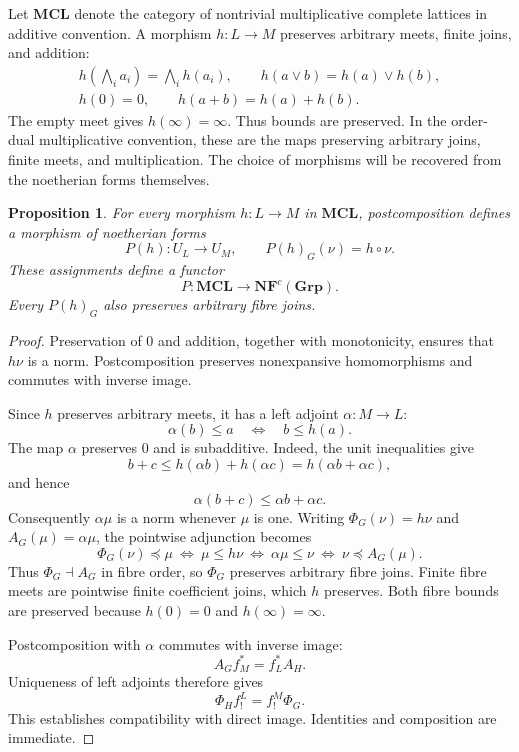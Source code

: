 \documentclass[12pt,a4paper]{amsart}
\newtheorem{proposition}[theorem]{Proposition}
\theoremstyle{definition}
\newcommand{\Grp}{\mathbf{Grp}}
\newcommand{\NF}{\mathbf{NF}}
\newcommand{\MCL}{\mathbf{MCL}}
\begin{document}
Let $\MCL$ denote the category of nontrivial multiplicative complete lattices in additive convention. A morphism $h:L\to M$ preserves arbitrary meets, finite joins, and addition:
\begin{equation}\label{eq:coefficientmap}
 \begin{gathered}
 h\left(\bigwedge_i a_i\right)=\bigwedge_i h(a_i),\qquad
 h(a\vee b)=h(a)\vee h(b),\\
 h(0)=0,\qquad h(a+b)=h(a)+h(b).
 \end{gathered}
\end{equation}
The empty meet gives $h(\infty)=\infty$. Thus bounds are preserved. In the order-dual multiplicative convention, these are the maps preserving arbitrary joins, finite meets, and multiplication. The choice of morphisms will be recovered from the noetherian forms themselves.

\begin{proposition}\label{prop:coefficient}
For every morphism $h:L\to M$ in $\MCL$, postcomposition defines a morphism of noetherian forms
\[
 P(h):U_L\longrightarrow U_M,\qquad
 P(h)_G(\nu)=h\circ\nu.
\]
These assignments define a functor
\[
                            P:\MCL\longrightarrow\NF^c(\Grp).
\]
Every $P(h)_G$ also preserves arbitrary fibre joins.
\end{proposition}
\begin{proof}
Preservation of $0$ and addition, together with monotonicity, ensures that $h\nu$ is a norm. Postcomposition preserves nonexpansive homomorphisms and commutes with inverse image.

Since $h$ preserves arbitrary meets, it has a left adjoint $\alpha:M\to L$:
\[
                  \alpha(b)\leq a\quad\Longleftrightarrow\quad b\leq h(a).
\]
The map $\alpha$ preserves $0$ and is subadditive. Indeed, the unit inequalities give
\[
 b+c\leq h(\alpha b)+h(\alpha c)=h(\alpha b+\alpha c),
\]
and hence
\[
                             \alpha(b+c)\leq\alpha b+\alpha c.
\]
Consequently $\alpha \mu$ is a norm whenever $\mu$ is one.
Writing $\Phi_G(\nu)=h\nu$ and $A_G(\mu)=\alpha \mu$, the pointwise adjunction becomes
\[
 \Phi_G(\nu)\preceq \mu
 \ \Longleftrightarrow\ \mu\leq h\nu
 \ \Longleftrightarrow\ \alpha \mu\leq\nu
 \ \Longleftrightarrow\ \nu\preceq A_G(\mu).
\]
Thus $\Phi_G\dashv A_G$ in fibre order, so $\Phi_G$ preserves arbitrary fibre joins.
Finite fibre meets are pointwise finite coefficient joins, which $h$ preserves.
Both fibre bounds are preserved because $h(0)=0$ and $h(\infty)=\infty$.

Postcomposition with $\alpha$ commutes with inverse image:
\[
                         A_G f_M^*=f_L^* A_H.
\]
Uniqueness of left adjoints therefore gives
\[
                         \Phi_H f_!^L=f_!^M\Phi_G.
\]
This establishes compatibility with direct image. Identities and composition are immediate.
\end{proof}
\end{document}
